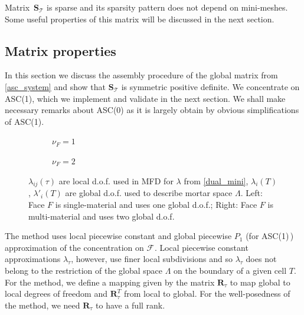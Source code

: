 \documentclass[12pt]{article}
\newcommand{\svginputw}[2][\linewidth]{\def\svgwidth{#1}} %
\newcommand{\vect}[1]{\boldsymbol{\mathbf{#1}}}
\newcommand{\bmesh}{{\vect{\mathcal T}}}
\newcommand{\mmesh}{{\vect{\mathcal \tau}}}
\newcommand{\bfaces}[1][]{{\vect{\mathcal F}_{\text{#1}}}}
\begin{document}
	Matrix~$\vect S_\bmesh$ is sparse and its sparsity pattern does not depend on mini-meshes. Some useful properties of this matrix will be discussed in the next section.



\subsection{Matrix properties}

In this section we discuss the assembly procedure of the global matrix from \eqref{asc_system} and show that $\vect S_\bmesh$ is symmetric positive definite. We concentrate on ASC(1), which we implement and validate  in the next section. We shall make necessary remarks about ASC(0) as it is largely obtain by obvious simplifications of ASC(1).
	
\begin{figure}[h]
		\centering		
		\begin{subfigure}{.45\linewidth}
			\centering
			\svginputw{e_plus_1.pdf_tex}
			\caption{$\nu_F = 1$}%
			\label{fig:asc_dofs:asc1:pc}
		\end{subfigure}%
		\qquad\quad
		\begin{subfigure}{.45\linewidth}
			\centering
			\svginputw{e_plus_2.pdf_tex}
			\caption{$\nu_F = 2$}		
		\end{subfigure}
\caption{$\lambda_{ij}(\mmesh)$ are local d.o.f. used in MFD for $\lambda$ from \eqref{dual_mini}, $\lambda_{i}(T)$, $\lambda'_{i}(T)$ are global d.o.f. used to describe mortar space $\Lambda$.
Left: Face $F$ is single-material and uses one global d.o.f.; Right: Face $F$ is multi-material and uses two global d.o.f.\label{fig:asc_dofs:asc1:mmc}}
	\end{figure}
	
The method uses local piecewise constant  and global piecewise $P_1$ (for ASC(1)\,) approximation of the concentration on $\bfaces$. Local piecewise constant approximations $\lambda_\mmesh$, however, use finer local subdivisions and so $\lambda_\mmesh$ does not belong to the restriction of the global space $\Lambda$ on the boundary of a given cell $T$. For the method, we define a mapping given by the matrix $\vect R_\mmesh$ to map global to local degrees of freedom and $\vect R_\mmesh^T$ from local   to global. For the well-posedness of the method, we need $\vect R_\mmesh$ to have a full rank.
\end{document}
